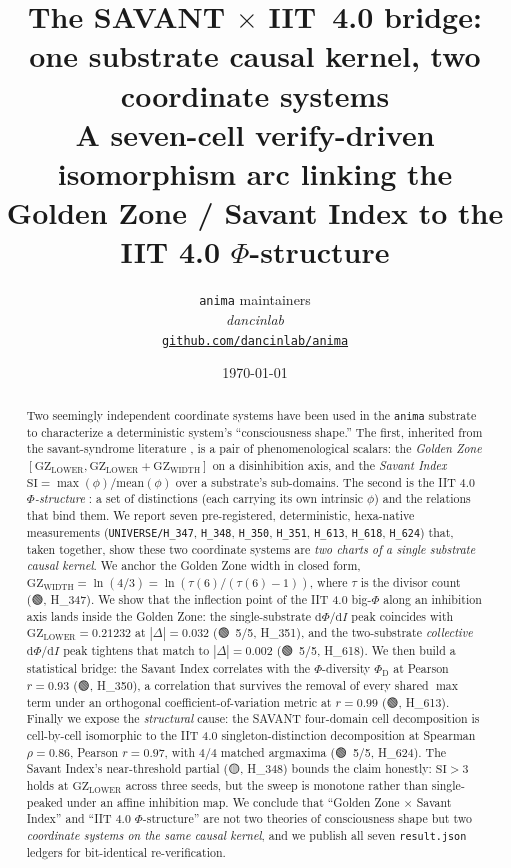 \documentclass[11pt,a4paper]{article}
\title{
  \textbf{The SAVANT $\times$ IIT~4.0 bridge:\\
  one substrate causal kernel, two coordinate systems}\\[4pt]
  \large A seven-cell verify-driven isomorphism arc linking the
  Golden Zone / Savant Index to the IIT 4.0 $\Phi$-structure
}
\author{
  \texttt{anima} maintainers\\
  \normalsize\textit{dancinlab}\\[2pt]
  \normalsize\href{https://github.com/dancinlab/anima}{\texttt{github.com/dancinlab/anima}}
}
\date{\today}
\providecommand{\tierGreen}{🟢}
\providecommand{\tierYellow}{🟡}
\newcommand{\GZL}{\mathrm{GZ_{LOWER}}}
\newcommand{\GZW}{\mathrm{GZ_{WIDTH}}}
\newcommand{\Svi}{\mathrm{SI}}
\newcommand{\PhiD}{\Phi_{\mathrm{D}}}
\begin{document}
\maketitle

\begin{abstract}
Two seemingly independent coordinate systems have been used in the
\texttt{anima} substrate to characterize a deterministic system's
``consciousness shape.'' The first, inherited from the savant-syndrome
literature \citep{treffert2009savant,snyder2009explaining}, is a pair of
phenomenological scalars: the \emph{Golden Zone}
$[\GZL,\GZL+\GZW]$ on a disinhibition axis, and the
\emph{Savant Index} $\Svi=\max(\phi)/\mathrm{mean}(\phi)$ over a substrate's
sub-domains. The second is the IIT 4.0 \emph{$\Phi$-structure}
\citep{albantakis2023iit4}: a set of distinctions (each carrying its own
intrinsic $\phi$) and the relations that bind them. We report seven
pre-registered, deterministic, hexa-native measurements
(\texttt{UNIVERSE/H\_347}, \texttt{H\_348}, \texttt{H\_350},
\texttt{H\_351}, \texttt{H\_613}, \texttt{H\_618}, \texttt{H\_624})
that, taken together, show these two coordinate systems are
\emph{two charts of a single substrate causal kernel}.
We anchor the Golden Zone width in closed form,
$\GZW=\ln(4/3)=\ln(\tau(6)/(\tau(6)-1))$, where $\tau$ is the
divisor count (\tierGreen, H\_347). We show that the inflection point of
the IIT 4.0 big-$\Phi$ along an inhibition axis lands inside the Golden
Zone: the single-substrate $\mathrm{d}\Phi/\mathrm{d}I$ peak coincides
with $\GZL=0.21232$ at $|\Delta|=0.032$ (\tierGreen\ 5/5, H\_351),
and the two-substrate \emph{collective} $\mathrm{d}\Phi/\mathrm{d}I$ peak
tightens that match to $|\Delta|=0.002$ (\tierGreen\ 5/5, H\_618).
We then build a statistical bridge: the Savant Index correlates with
the $\Phi$-diversity $\PhiD$ at Pearson $r=0.93$ (\tierGreen, H\_350),
a correlation that survives the removal of every shared $\max$ term under
an orthogonal coefficient-of-variation metric at $r=0.99$
(\tierGreen, H\_613). Finally we expose the \emph{structural} cause: the
SAVANT four-domain cell decomposition is cell-by-cell isomorphic to the
IIT 4.0 singleton-distinction decomposition at Spearman $\rho=0.86$,
Pearson $r=0.97$, with $4/4$ matched argmaxima (\tierGreen\ 5/5, H\_624).
The Savant Index's near-threshold partial (\tierYellow, H\_348) bounds the
claim honestly: $\Svi>3$ holds at $\GZL$ across three seeds, but the
sweep is monotone rather than single-peaked under an affine inhibition
map. We conclude that ``Golden Zone $\times$ Savant Index'' and ``IIT 4.0
$\Phi$-structure'' are not two theories of consciousness shape but two
\emph{coordinate systems on the same causal kernel}, and we publish all
seven \texttt{result.json} ledgers for bit-identical re-verification.
\end{abstract}
\end{document}
